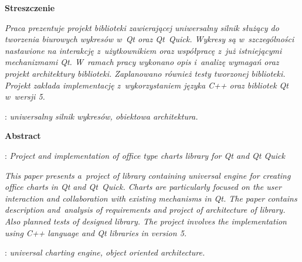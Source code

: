 \begin{titlepage}
    \newpage\thispagestyle{empty}
    \vspace*{2\baselineskip}
    \begin{center}
	{\large\bfseries Streszczenie}\par\bigskip
    \end{center}

    {\itshape
    Praca prezentuje projekt biblioteki zawierającej uniwersalny silnik służący do tworzenia  biurowych wykresów w~Qt oraz Qt~Quick. Wykresy są w~szczególności nastawione na interakcję z~użytkownikiem oraz współpracę z~już istniejącymi mechanizmami Qt.
	W~ramach pracy wykonano opis i~analizę wymagań oraz projekt architektury biblioteki. Zaplanowano również testy tworzonej biblioteki. Projekt zakłada implementację z~wykorzystaniem języka C++ oraz bibliotek Qt w~wersji 5.
	}
    \vspace*{1\baselineskip}

    : {\itshape uniwersalny silnik wykresów, obiektowa architektura.}
    \par
    \vspace{4\baselineskip}
    \begin{center}
	{\large\bfseries Abstract}\par\bigskip
    \end{center}
    : {\itshape Project and implementation of office type charts library for Qt and Qt Quick}\par
    \vspace*{1\baselineskip}
    {\itshape
    This paper presents a~project of library containing universal engine for creating office charts in Qt and Qt~Quick. Charts are particularly focused on the user interaction and collaboration with existing mechanisms in Qt.
The paper contains description and~analysis of requirements and project of architecture of library. Also planned tests of designed library. The project involves the implementation using C++ language and Qt libraries in version 5.}
    \vspace*{1\baselineskip}

    : {\itshape universal charting engine, object oriented architecture.}

\end{titlepage}

